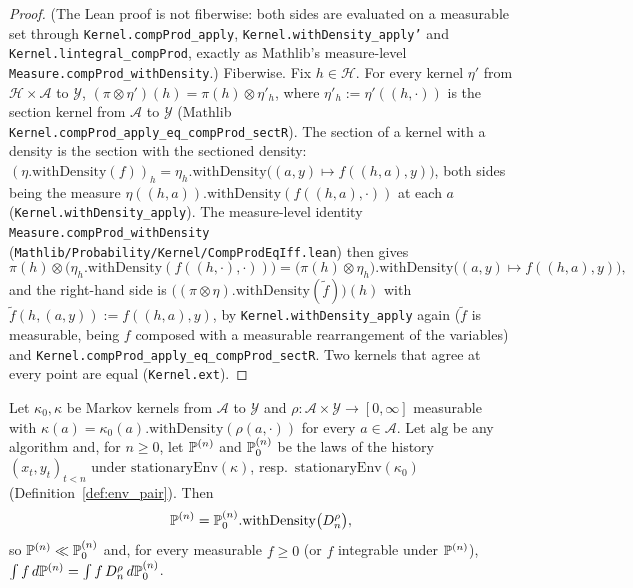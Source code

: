 \begin{proof}
\leanok
(The Lean proof is not fiberwise: both sides are evaluated on a measurable set through
\texttt{Kernel.compProd\_apply}, \texttt{Kernel.withDensity\_apply'} and
\texttt{Kernel.lintegral\_compProd}, exactly as Mathlib's measure-level
\texttt{Measure.compProd\_withDensity}.) Fiberwise. Fix $h\in\mathcal{H}$. For every kernel $\eta'$ from $\mathcal{H}\times\mathcal{A}$
to $\mathcal{Y}$, $(\pi\otimes\eta')(h) = \pi(h)\otimes\eta'_h$, where
$\eta'_h := \eta'((h,\cdot))$ is the section kernel from $\mathcal{A}$ to $\mathcal{Y}$
(Mathlib \texttt{Kernel.compProd\_apply\_eq\_compProd\_sectR}). The section of a kernel with
a density is the section with the sectioned density:
$(\eta.\mathrm{withDensity}(f))_h = \eta_h.\mathrm{withDensity}\big((a,y)\mapsto f((h,a),y)\big)$,
both sides being the measure $\eta((h,a)).\mathrm{withDensity}(f((h,a),\cdot))$ at each $a$
(\texttt{Kernel.withDensity\_apply}). The measure-level identity
\texttt{Measure.compProd\_withDensity} (\texttt{Mathlib/Probability/Kernel/CompProdEqIff.lean})
then gives
\[
  \pi(h)\otimes\big(\eta_h.\mathrm{withDensity}(f((h,\cdot),\cdot))\big)
  = \big(\pi(h)\otimes\eta_h\big).\mathrm{withDensity}\big((a,y)\mapsto f((h,a),y)\big),
\]
and the right-hand side is $\big((\pi\otimes\eta).\mathrm{withDensity}(\tilde f)\big)(h)$
with $\tilde f(h,(a,y)) := f((h,a),y)$, by \texttt{Kernel.withDensity\_apply} again
($\tilde f$ is measurable, being $f$ composed with a measurable rearrangement of the
variables) and \texttt{Kernel.compProd\_apply\_eq\_compProd\_sectR}. Two kernels that agree
at every point are equal (\texttt{Kernel.ext}).
\end{proof}

\begin{lemma}\label{lem:env_likelihood_ratio}
\leanok
{}
Let $\kappa_0,\kappa$ be Markov kernels from $\mathcal{A}$ to $\mathcal{Y}$ and
$\rho : \mathcal{A}\times\mathcal{Y}\to[0,\infty]$ measurable with
$\kappa(a) = \kappa_0(a).\mathrm{withDensity}(\rho(a,\cdot))$ for every $a\in\mathcal{A}$. Let
$\mathrm{alg}$ be any algorithm and, for $n\ge0$, let $\mathbb{P}^{(n)}$ and $\mathbb{P}_0^{(n)}$ be the
laws of the history $(x_t,y_t)_{t< n}$ under $\mathrm{stationaryEnv}(\kappa)$, resp.\
$\mathrm{stationaryEnv}(\kappa_0)$ (Definition~\ref{def:env_pair}). Then
\[
  \mathbb{P}^{(n)} = \mathbb{P}_0^{(n)}.\mathrm{withDensity}\big(D_n^\rho\big),
\]
so $\mathbb{P}^{(n)}\ll\mathbb{P}_0^{(n)}$ and, for every measurable $f\ge0$ (or $f$ integrable under
$\mathbb{P}^{(n)}$), $\int f\,d\mathbb{P}^{(n)} = \int f\,D_n^\rho\,d\mathbb{P}_0^{(n)}$.
\end{lemma}

